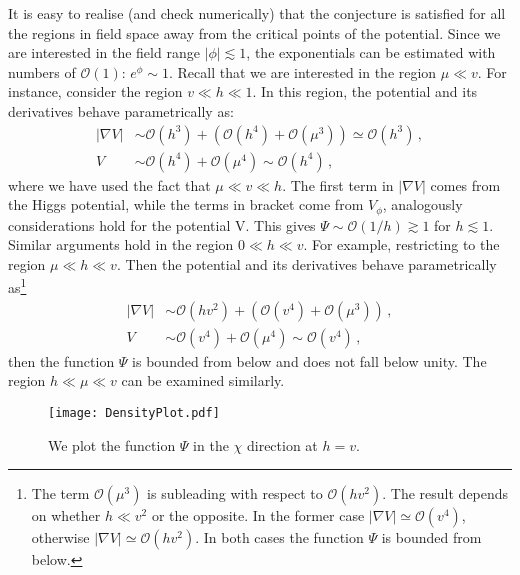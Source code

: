 \documentclass[11pt,a4paper]{article}
\newcommand{\mc}{\mathcal}
\begin{document}
\begin{itemize}
It is easy to realise (and check numerically) that the conjecture is satisfied for all the regions in field space away from the critical points of the potential. Since we are interested in the field range $|\phi| \lesssim 1$, the exponentials can be estimated with numbers of $\mathcal{O}(1)$: $e^{{\phi}} \sim 1$. Recall  that we are interested in the region $\mu \ll v$. For instance, consider the region ${v} \ll {h} \ll 1$. In this region, the potential and its derivatives behave parametrically as:
\begin{align}
|\nabla V| &\sim \mc{O}(h^3) + \left(\mc{O}(h^4) + \mc{O}(\mu^3)\right) \simeq \mc{O}(h^3) \,, \\
V &\sim \mc{O}(h^4) + \mc{O}(\mu^4) \sim \mc{O}(h^4) \,,
\end{align}
where we have used the fact that $\mu \ll v \ll h$. The first term in $|\nabla {V}|$ comes from the Higgs potential, while the terms in bracket come from ${V}_{{\phi}}$, analogously considerations hold for the potential V. This gives ${\Psi} \sim \mc{O}(1/{h}) \gtrsim 1$ for $h \lesssim 1$. Similar arguments hold in the region $0 \ll {h} \ll {v}$. For example, restricting to the region $\mu \ll h \ll v$. Then the potential and its derivatives behave parametrically as\footnote{The term $\mc{O}(\mu^3)$ is subleading with respect to $\mc{O}({h} {v}^2)$. The result depends on whether $h \ll v^2$ or the opposite. In the former case $|\nabla {V}| \simeq \mc{O}({v}^4)$, otherwise $|\nabla {V}| \simeq \mathcal{O}({h} {v}^2)$. In both cases the function $\Psi$ is bounded from below.}
\begin{align}
|\nabla {V}| &\sim \mc{O}({h} {v}^2) + \left(\mc{O}({v}^4) + \mc{O}({\mu}^3)\right) \,, \\
{V} &\sim \mc{O}({v}^4) + \mc{O}({\mu}^4) \sim \mc{O}({v}^4) \,,
\end{align}
then the function ${\Psi}$ is bounded from below and does not fall below unity. The region ${h} \ll {\mu} \ll {v}$ can be examined similarly.

\begin{figure}
\begin{center}
\texttt{[image: DensityPlot.pdf]}
\end{center}
\caption{We plot the function $\Psi$ in the $\chi$ direction at $h = v$.}
\label{fig:DensityPlot}
\end{figure}


\end{itemize}
\end{document}
